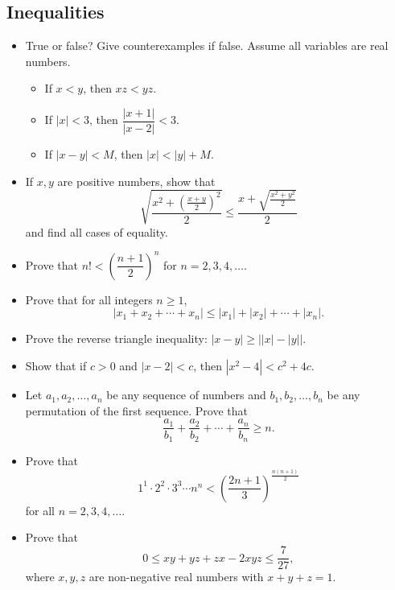 \documentclass[12pt]{article}
\begin{document}
\subsection{Inequalities}
\begin{itemize}
  \item True or false? Give counterexamples if false. Assume all variables are real numbers.
  \begin{itemize}
    \item If $x < y$, then $xz < yz$.
    \item If $|x| < 3$, then $\dfrac{|x+1|}{|x-2|} < 3$.
    \item If $|x-y| < M$, then $|x| < |y| + M$.
  \end{itemize}

  \item If $x, y$ are positive numbers, show that
  \[
  \sqrt{\frac{x^2 + \left(\frac{x+y}{2}\right)^2}{2}} \le \frac{x + \sqrt{\frac{x^2+y^2}{2}}}{2}
  \]
  and find all cases of equality.

  \item Prove that $n! < \left(\dfrac{n+1}{2}\right)^n$ for $n = 2, 3, 4, \ldots$.

  \item Prove that for all integers $n \ge 1$,
  \[
  |x_1 + x_2 + \cdots + x_n| \le |x_1| + |x_2| + \cdots + |x_n|.
  \]

  \item Prove the reverse triangle inequality: $|x-y| \ge \bigl||x|-|y|\bigr|$.

  \item Show that if $c > 0$ and $|x-2| < c$, then $|x^2-4| < c^2 + 4c$.

  \item Let $a_1, a_2, \ldots, a_n$ be any sequence of numbers and $b_1, b_2, \ldots, b_n$ be any permutation of the first sequence. Prove that
  \[
  \frac{a_1}{b_1} + \frac{a_2}{b_2} + \cdots + \frac{a_n}{b_n} \ge n.
  \]

  \item Prove that
  \[
  1^1 \cdot 2^2 \cdot 3^3 \cdots n^n < \left(\frac{2n+1}{3}\right)^{\frac{n(n+1)}{2}}
  \]
  for all $n = 2, 3, 4, \ldots$.

  \item  Prove that
  \[
  0 \le xy + yz + zx - 2xyz \le \frac{7}{27},
  \]
  where $x, y, z$ are non-negative real numbers with $x+y+z = 1$.
\end{itemize}
\end{document}
